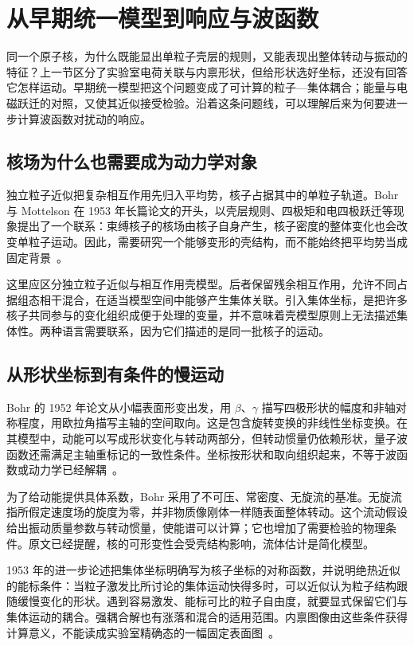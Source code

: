 \section{从早期统一模型到响应与波函数}\label{sec:1-3}

同一个原子核，为什么既能显出单粒子壳层的规则，又能表现出整体转动与振动的特征？上一节区分了实验室电荷关联与内禀形状，但给形状选好坐标，还没有回答它怎样运动。早期统一模型把这个问题变成了可计算的粒子---集体耦合；能量与电磁跃迁的对照，又使其近似接受检验。沿着这条问题线，可以理解后来为何要进一步计算波函数对扰动的响应。

\subsection{核场为什么也需要成为动力学对象}\label{sec:1-3-1}

独立粒子近似把复杂相互作用先归入平均势，核子占据其中的单粒子轨道。Bohr 与 Mottelson 在 1953 年长篇论文的开头，以壳层规则、四极矩和电四极跃迁等现象提出了一个联系：束缚核子的核场由核子自身产生，核子密度的整体变化也会改变单粒子运动。因此，需要研究一个能够变形的壳结构，而不能始终把平均势当成固定背景~\cite{bohr-mottelson-1953-collective-individual-original}。

这里应区分独立粒子近似与相互作用壳模型。后者保留残余相互作用，允许不同占据组态相干混合，在适当模型空间中能够产生集体关联。引入集体坐标，是把许多核子共同参与的变化组织成便于处理的变量，并不意味着壳模型原则上无法描述集体性。两种语言需要联系，因为它们描述的是同一批核子的运动。

\subsection{从形状坐标到有条件的慢运动}\label{sec:1-3-2}

Bohr 的 1952 年论文从小幅表面形变出发，用 $\beta$、$\gamma$ 描写四极形状的幅度和非轴对称程度，用欧拉角描写主轴的空间取向。这是包含旋转变换的非线性坐标变换。在其模型中，动能可以写成形状变化与转动两部分，但转动惯量仍依赖形状，量子波函数还需满足主轴重标记的一致性条件。坐标按形状和取向组织起来，不等于波函数或动力学已经解耦~\cite{bohr-1952-surface-particle-coupling}。

为了给动能提供具体系数，Bohr 采用了不可压、常密度、无旋流的基准。无旋流指所假定速度场的旋度为零，并非物质像刚体一样随表面整体转动。这个流动假设给出振动质量参数与转动惯量，使能谱可以计算；它也增加了需要检验的物理条件。原文已经提醒，核的可形变性会受壳结构影响，流体估计是简化模型。

1953 年的进一步论述把集体坐标明确写为核子坐标的对称函数，并说明绝热近似的能标条件：当粒子激发比所讨论的集体运动快得多时，可以近似认为粒子结构跟随缓慢变化的形状。遇到容易激发、能标可比的粒子自由度，就要显式保留它们与集体运动的耦合。强耦合解也有涨落和混合的适用范围。内禀图像由这些条件获得计算意义，不能读成实验室精确态的一幅固定表面图~\cite{bohr-mottelson-1953-collective-individual-original}。

